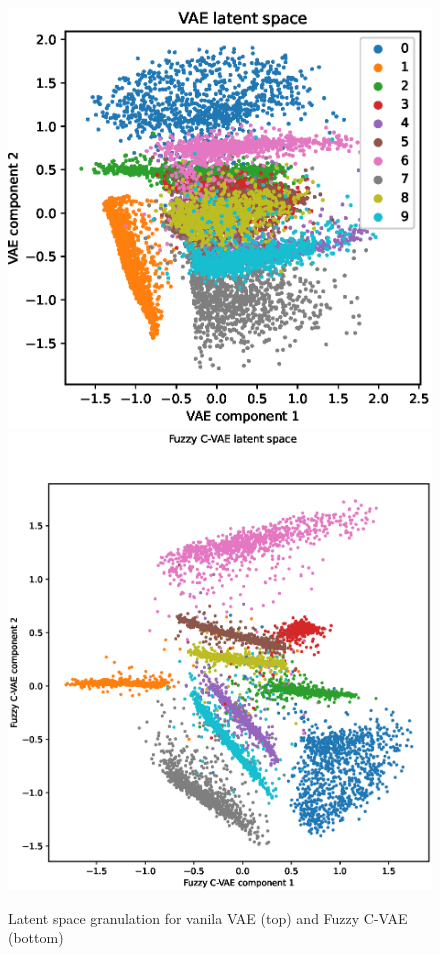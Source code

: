 \documentclass[runningheads]{llncs}
\begin{document}
\begin{figure}[h]  
    \centering
    \includegraphics[width=1\textwidth]{fig2a-vae-all-features.eps}
    \includegraphics[width=1\textwidth]{fig2b-fcvae-all-features.eps}
    
    \caption{Latent space granulation for vanila VAE (top) and Fuzzy C-VAE (bottom)}
    \label{fig:clustering}
\end{figure}
\end{document}
